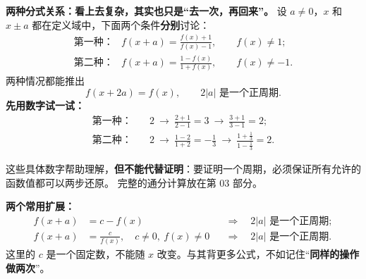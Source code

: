 \clearpage
\begin{statementbox}
\textbf{两种分式关系：看上去复杂，其实也只是“去一次，再回来”。}
设 $a\ne0$，$x$ 和 $x\pm a$ 都在定义域中，下面两个条件\textbf{分别}讨论：
\[
\begin{array}{ll}
\text{第一种：}&\displaystyle f(x+a)=\frac{f(x)+1}{f(x)-1},\qquad f(x)\ne1;\\[10pt]
\text{第二种：}&\displaystyle f(x+a)=\frac{1-f(x)}{1+f(x)},\qquad f(x)\ne-1.
\end{array}
\]
两种情况都能推出
\[
\boxed{f(x+2a)=f(x),\qquad 2|a|\text{ 是一个正周期}.}
\]
\textbf{先用数字试一试：}
\[
\begin{aligned}
\text{第一种：}\quad &2\ \longrightarrow\ \frac{2+1}{2-1}=3
\ \longrightarrow\ \frac{3+1}{3-1}=2;\\
\text{第二种：}\quad &2\ \longrightarrow\ \frac{1-2}{1+2}=-\frac13
\ \longrightarrow\ \frac{1+\frac13}{1-\frac13}=2.
\end{aligned}
\]

这些具体数字帮助理解，\textbf{但不能代替证明}：要证明一个周期，必须保证所有允许的函数值都可以两步还原。
完整的通分计算放在第 03 部分。





\medskip
\textbf{两个常用扩展：}
\[
\begin{aligned}
 f(x+a)&=c-f(x) &&\Longrightarrow\quad 2|a|\text{ 是一个正周期};\\
 f(x+a)&=\frac{c}{f(x)},\quad c\ne0,\ f(x)\ne0
 &&\Longrightarrow\quad 2|a|\text{ 是一个正周期}.
\end{aligned}
\]
这里的 $c$ 是一个固定数，不能随 $x$ 改变。与其背更多公式，不如记住“\textbf{同样的操作做两次}”。
\end{statementbox}
